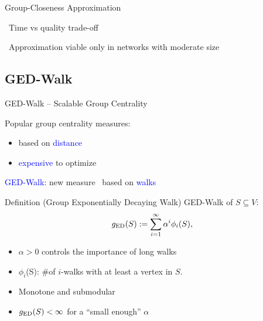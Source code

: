 \documentclass[10pt,titlepage,english,presentation]{beamer}
\newcommand{\emphcolor}{blue}
\renewcommand{\emph}[1]{\textcolor{\emphcolor}{#1}}
\begin{document}
\begin{frame}[t]{Group-Closeness Approximation}
\begin{minipage}[t]{.4\textwidth}
\faHandORight\ Time vs quality trade-off\smallskip

\faHandORight\ Approximation viable only in networks with moderate size
\end{minipage}
\end{frame}


\subsection{GED-Walk}
\begin{frame}[t]{GED-Walk -- Scalable Group Centrality}
\small\smallskip

\begin{minipage}[t]{.45\textwidth}
Popular group centrality measures:
\begin{itemize}
\small
\item based on \emph{distance}
\item \emph{expensive} to optimize
\end{itemize}

\end{minipage}\hfill
\begin{minipage}[t]{.5\textwidth}
\emph{GED-Walk:} new measure~\parencite{DBLP:conf/alenex/AngrimanGBZGM20}
 based on \emph{walks}
\end{minipage}

\begin{block}{Definition (Group Exponentially Decaying Walk)}
\small
GED-Walk of $S \subseteq V$:
\[g_{\text{ED}}(S) := \sum_{i = 1}^\infty\alpha^i\phi_i(S),\]
\vspace{-4mm}
\begin{itemize}
    \item $\alpha > 0$ controls the importance of long walks
    \item $\phi_i$(S): \#of $i$-walks with at least a vertex in $S$.
\end{itemize}
\end{block}

\begin{itemize}
    \small
    \item Monotone and submodular
    \item $g_{\text{ED}}(S) < \infty$ for a \enquote{small enough} $\alpha$
\end{itemize}
\end{frame}
\end{document}
